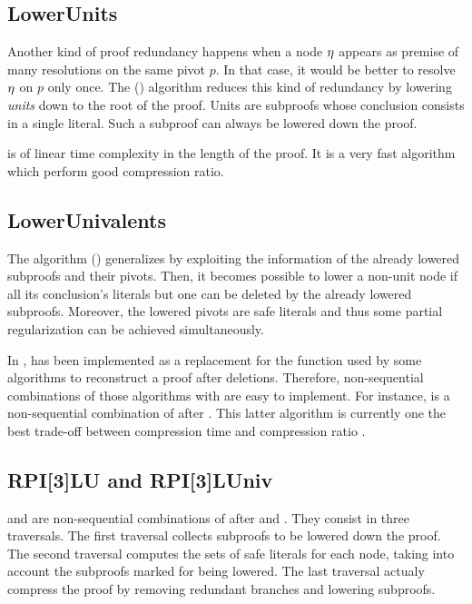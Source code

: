 \documentclass{llncs}
\begin{document}
\subsection{LowerUnits}

Another kind of proof redundancy happens when a node $\eta$ appears as premise of many resolutions
on the same pivot $p$. In that case, it would be better to resolve $\eta$ on $p$ only once. The
 () algorithm \cite{LURPI} reduces this kind of redundancy by lowering
\emph{units} down to the root of the proof. Units are subproofs whose conclusion consists in a
single literal. Such a subproof can always be lowered down the proof.

 is of linear time complexity in the length of the proof. It is a very fast
algorithm which perform good compression ratio.

\subsection{LowerUnivalents}

The  algorithm \cite{LUniv} () generalizes  by
exploiting the information of the already lowered subproofs and their pivots. Then, it becomes
possible to lower a non-unit node if all its conclusion's literals but one can be deleted by the
already lowered subproofs. Moreover, the lowered pivots are safe literals and thus some partial
regularization can be achieved simultaneously.

In \skeptik,  has been implemented as a replacement for the  function
used by some algorithms to reconstruct a proof after deletions. Therefore, non-sequential
combinations of those algorithms with  are easy to implement. For instance,
 is a non-sequential combination of  after . This latter
algorithm is currently one the best trade-off between compression time and compression ratio
\cite{LUniv}.

\subsection{RPI[3]LU and RPI[3]LUniv}

 and  are non-sequential combinations of  after 
and . They consist in three traversals. The first traversal collects subproofs to be
lowered down the proof. The second traversal computes the sets of safe literals for each node,
taking into account the subproofs marked for being lowered. The last traversal actualy compress the
proof by removing redundant branches and lowering subproofs.
\end{document}
